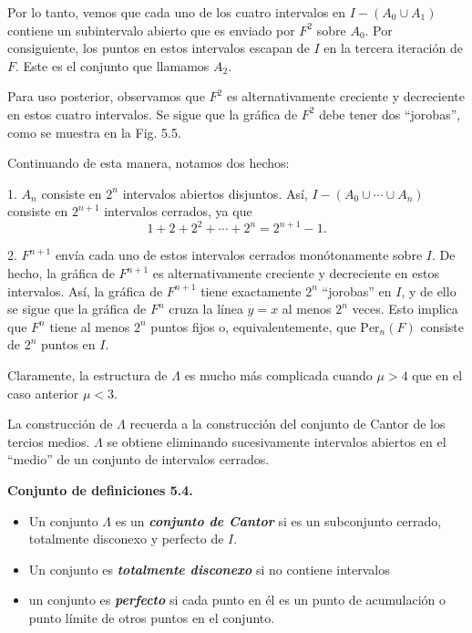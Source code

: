 \documentclass[10pt,a4paper]{book}
\begin{document}
Por lo tanto, vemos que cada uno de los cuatro intervalos en $I-(A_{0}\cup A_{1})$ 
contiene un subintervalo abierto que es enviado por $F^{2}$ sobre $A_{0}$.  
Por consiguiente, los puntos en estos intervalos escapan de $I$ en la tercera iteración de $F$.  
Este es el conjunto que llamamos $A_{2}$.  

Para uso posterior, observamos que $F^{2}$ es alternativamente creciente y decreciente en estos cuatro intervalos.  
Se sigue que la gráfica de $F^{2}$ debe tener dos “jorobas”, como se muestra en la Fig. 5.5.

\medskip

Continuando de esta manera, notamos dos hechos:  

1. $A_{n}$ consiste en $2^{n}$ intervalos abiertos disjuntos.  
Así, $I-(A_{0}\cup \cdots \cup A_{n})$ consiste en $2^{n+1}$ intervalos cerrados, ya que
\[
1+2+2^{2}+\cdots+2^{n}=2^{n+1}-1.
\]

2. $F^{n+1}$ envía cada uno de estos intervalos cerrados monótonamente sobre $I$.  
De hecho, la gráfica de $F^{n+1}$ es alternativamente creciente y decreciente en estos intervalos.  
Así, la gráfica de $F^{n+1}$ tiene exactamente $2^{n}$ “jorobas” en $I$, 
y de ello se sigue que la gráfica de $F^{n}$ cruza la línea $y=x$ al menos $2^{n}$ veces.  
Esto implica que $F^{n}$ tiene al menos $2^{n}$ puntos fijos o, equivalentemente, 
que $\text{Per}_{n}(F)$ consiste de $2^{n}$ puntos en $I$.  

Claramente, la estructura de $\Lambda$ es mucho más complicada cuando $\mu>4$ 
que en el caso anterior $\mu<3$.

\medskip

La construcción de $\Lambda$ recuerda a la construcción del conjunto de Cantor de los tercios medios.  
$\Lambda$ se obtiene eliminando sucesivamente intervalos abiertos en el “medio” de un conjunto de intervalos cerrados.

\bigskip

\textbf{Conjunto de definiciones 5.4.}

\begin{itemize}
\item Un conjunto $\Lambda$ es un \textbf{\textit{conjunto de Cantor}} si es un subconjunto cerrado, totalmente disconexo y perfecto de $I$.
\item Un conjunto es \textbf{\textit{totalmente disconexo}} si no contiene intervalos
\item un conjunto es \textbf{\textit{perfecto}} si cada punto en él es un punto de acumulación o punto límite de otros puntos en el conjunto.
\end{itemize}  
\end{document}
